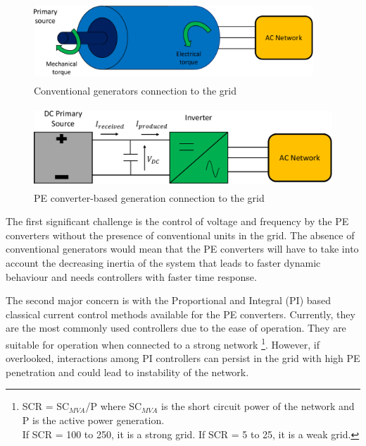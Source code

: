 \begin{figure}[H]
\centering
    \includegraphics[height = 3cm,width = 10.5cm]{Diagrams/Chapter_1/Energy_conv_system.pdf}
    \caption{Conventional generators connection to the grid \cite{denis_migrate_2018}}
    \label{fig:Energy_conv_system}
\end{figure}
\vspace{0mm}
\begin{figure}[H]
\centering
    \includegraphics[height = 3cm,width = 11.5cm]{Diagrams/Chapter_1/Energy_conv_system_2.pdf}
    \caption{PE converter-based generation connection to the grid \cite{denis_migrate_2018}}
    \label{fig:Energy_conv_system_2}
\end{figure}

The first significant challenge is the control of voltage and frequency by the \gls{PE} converters without the presence of conventional units in the grid. The absence of conventional generators would mean that the \gls{PE} converters will have to take into account the decreasing inertia of the system that leads to faster dynamic behaviour and needs controllers with faster time response. 

The second major concern is with the Proportional and Integral (\gls{PI}) based classical current control methods available for the \gls{PE} converters. Currently, they are the most commonly used controllers due to the ease of operation. They are suitable for operation when connected to a strong network \footnote{SCR = SC$_{MVA}$/P where SC$_{MVA}$ is the short circuit power of the network and P is the active power generation. \\
If SCR = 100 to 250, it is a strong grid. If SCR = 5 to 25, it is a weak grid.}. However, if overlooked, interactions among \gls{PI} controllers can persist in the grid with high \gls{PE} penetration and could lead to instability of the network.

